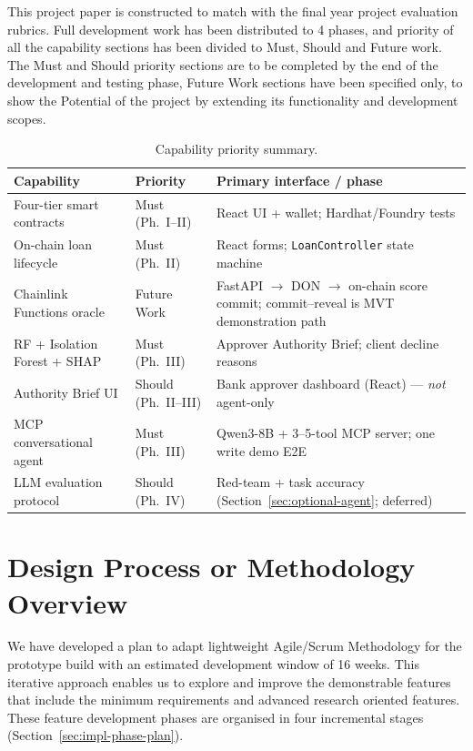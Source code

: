 \label{ch:methodology}
\label{ch:design-alternatives}

This project paper is constructed to match with the final year project evaluation rubrics. Full development work has been distributed to 4 phases, and priority of all the capability sections has been divided to Must, Should and Future work. The Must and Should priority sections are to be completed by the end of the development and testing phase, Future Work sections have been specified only, to show the Potential of the project by extending its functionality and development scopes.

\begin{table}[H]
\centering
\caption[Capability priority summary]{Capability priority summary.}
\label{tab:capability-priority}
\begin{tabular}{p{3.2cm}p{2.2cm}p{7.8cm}}
\toprule
\tableheadcolor
\textbf{Capability} & \textbf{Priority} & \textbf{Primary interface / phase} \\
\midrule
Four-tier smart contracts & Must (Ph.~I--II) & React UI + wallet; Hardhat/Foundry tests \\
On-chain loan lifecycle & Must (Ph.~II) & React forms; \texttt{LoanController} state machine \\
Chainlink Functions oracle & Future Work & FastAPI $\to$ DON $\to$ on-chain score commit; commit--reveal is MVT demonstration path \\
RF + Isolation Forest + SHAP & Must (Ph.~III) & Approver Authority Brief; client decline reasons \\
Authority Brief UI & Should (Ph.~II--III) & Bank approver dashboard (React) --- \textit{not} agent-only \\
MCP conversational agent & Must (Ph.~III) & Qwen3-8B + 3--5-tool MCP server; one write demo E2E \\
LLM evaluation protocol & Should (Ph.~IV) & Red-team + task accuracy (Section~\ref{sec:optional-agent}; deferred) \\
\bottomrule
\end{tabular}
\end{table}


\section{Design Process or Methodology Overview}
\label{sec:design-process-overview}

We have developed a plan to adapt lightweight Agile/Scrum Methodology for the prototype build with an estimated development window of 16 weeks. This iterative approach enables us to explore and improve the demonstrable features that include the minimum requirements and advanced research oriented features. These feature development phases are organised in four incremental stages (Section~\ref{sec:impl-phase-plan}).

